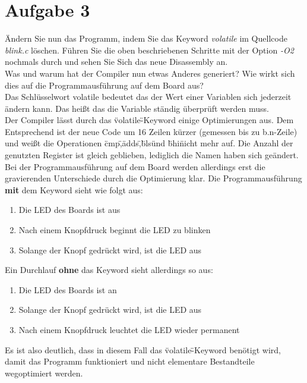 \section{Aufgabe 3}
Ändern Sie nun das Programm, indem Sie das Keyword \textit{volatile} im Quellcode \textit{blink.c} löschen. Führen Sie die oben beschriebenen Schritte mit der Option \textit{-O2} nochmals durch und sehen Sie Sich das neue Disassembly an.\\ 

Was und warum hat der Compiler nun etwas Anderes generiert? Wie wirkt sich dies auf die Programmausführung auf dem Board aus?\\ 

Das Schlüsselwort volatile bedeutet das der Wert einer Variablen sich jederzeit ändern kann. Das hei\ss{}t das die Variable ständig überprüft werden muss.\\

Der Compiler lässt durch das \"volatile\"-Keyword einige Optimierungen aus. 
Dem Entsprechend ist der neue Code um 16 Zeilen kürzer (gemessen bis zu b.n-Zeile) und weißt die Operationen \"cmp\",\"adds\",\"bls\" und \"bhi\" nicht mehr auf. 
Die Anzahl der genutzten Register ist gleich geblieben, lediglich die Namen haben sich geändert. \\

Bei der Programmausführung auf dem Board werden allerdings erst die gravierenden Unterschiede durch die Optimierung klar. 
Die Programmausführung \textbf{mit} dem Keyword sieht wie folgt aus:\\

\begin{enumerate}
\item Die LED des Boards ist aus
\item Nach einem Knopfdruck beginnt die LED zu blinken
\item Solange der Knopf gedrückt wird, ist die LED aus
\end{enumerate}

Ein Durchlauf \textbf{ohne} das Keyword sieht allerdings so aus:\\
\begin{enumerate}
\item Die LED des Boards ist an
\item Solange der Knopf gedrückt wird, ist die LED aus
\item Nach einem Knopfdruck leuchtet die LED wieder permanent
\end{enumerate}

Es ist also deutlich, dass in diesem Fall das \"volatile\"-Keyword benötigt wird, damit das Programm funktioniert und nicht elementare Bestandteile wegoptimiert werden.
